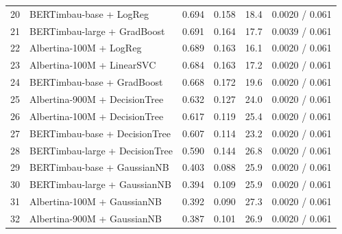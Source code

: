 \begin{table}[t]
\begin{tabular}{rlrrrl}
20 & BERTimbau-base + LogReg & 0.694 & 0.158 & 18.4 & 0.0020 / 0.061 \\
21 & BERTimbau-large + GradBoost & 0.691 & 0.164 & 17.7 & 0.0039 / 0.061 \\
22 & Albertina-100M + LogReg & 0.689 & 0.163 & 16.1 & 0.0020 / 0.061 \\
23 & Albertina-100M + LinearSVC & 0.684 & 0.163 & 17.2 & 0.0020 / 0.061 \\
24 & BERTimbau-base + GradBoost & 0.668 & 0.172 & 19.6 & 0.0020 / 0.061 \\
25 & Albertina-900M + DecisionTree & 0.632 & 0.127 & 24.0 & 0.0020 / 0.061 \\
26 & Albertina-100M + DecisionTree & 0.617 & 0.119 & 25.4 & 0.0020 / 0.061 \\
27 & BERTimbau-base + DecisionTree & 0.607 & 0.114 & 23.2 & 0.0020 / 0.061 \\
28 & BERTimbau-large + DecisionTree & 0.590 & 0.144 & 26.8 & 0.0020 / 0.061 \\
29 & BERTimbau-base + GaussianNB & 0.403 & 0.088 & 25.9 & 0.0020 / 0.061 \\
30 & BERTimbau-large + GaussianNB & 0.394 & 0.109 & 25.9 & 0.0020 / 0.061 \\
31 & Albertina-100M + GaussianNB & 0.392 & 0.090 & 27.3 & 0.0020 / 0.061 \\
32 & Albertina-900M + GaussianNB & 0.387 & 0.101 & 26.9 & 0.0020 / 0.061 \\
\bottomrule
\end{tabular}
\end{table}
